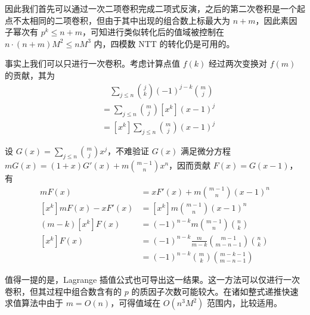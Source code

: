 因此我们首先可以通过一次二项卷积完成二项式反演，之后的第二次卷积是一个起点不太相同的二项卷积，但由于其中出现的组合数上标最大为 $n+m$，因此素因子幂次有 $p^k\le n+m$，可知进行类似转化后的值域被控制在 $n\cdot (n+m)M^2\le nM^3$ 内，四模数 NTT 的转化仍是可用的。

事实上我们可以只进行一次卷积。考虑计算点值 $f(k)$ 经过两次变换对 $f(m)$ 的贡献，其为
\begin{align*}
&\quad\sum_{j\le n} \binom j k (-1)^{j-k} \binom m j\\
&=\sum_{j\le n} \binom m j [x^k](x-1)^j\\
&= [x^k] \sum_{j\le n} \binom m j (x-1)^j
\end{align*}

设 $G(x)=\sum_{j\le n}\binom m j x^j$，不难验证 $G(x)$ 满足微分方程 $mG(x)=(1+x)G'(x) + m\binom {m-1}n x^n$，因而贡献 $F(x)=G(x-1)$，有
\begin{align*}
mF(x)&=xF'(x)+m\binom {m-1}n(x-1)^n\\
[x^k] mF(x)-xF'(x)&=[x^k]m\binom {m-1}n(x-1)^n\\
(m-k) [x^k] F(x)&= (-1)^{n-k} m \binom {m-1}n \binom n k\\
[x^k] F(x)&= (-1)^{n-k} \frac{m}{m-k} \binom {m-1}{m-n-1} \binom n k\\
&= (-1)^{n-k} \binom m k \binom {m-k-1}{m-n-1}
\end{align*}

值得一提的是，Lagrange 插值公式也可导出这一结果。这一方法可以仅进行一次卷积，但其过程中组合数含有的 $p$ 的质因子次数可能较大。在诸如整式递推快速求值算法中由于 $m=O(n)$，可得值域在 $O(n^3M^2)$ 范围内，比较适用。






